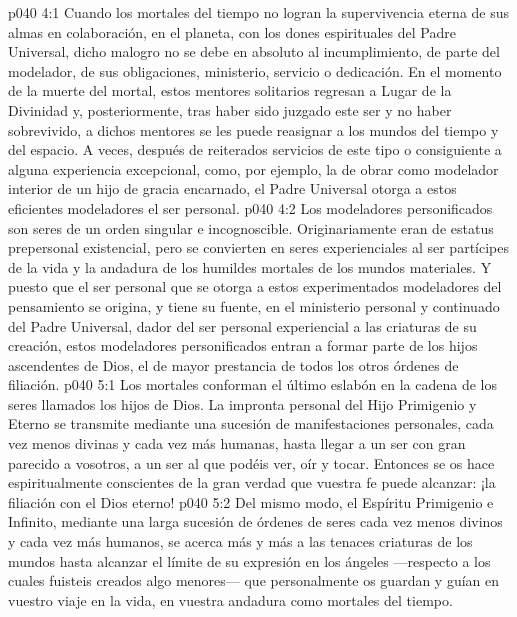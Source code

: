 \vs p040 4:1 Cuando los mortales del tiempo no logran la supervivencia eterna de sus almas en colaboración, en el planeta, con los dones espirituales del Padre Universal, dicho malogro no se debe en absoluto al incumplimiento, de parte del modelador, de sus obligaciones, ministerio, servicio o dedicación. En el momento de la muerte del mortal, estos mentores solitarios regresan a Lugar de la Divinidad y, posteriormente, tras haber sido juzgado este ser y no haber sobrevivido, a dichos mentores se les puede reasignar a los mundos del tiempo y del espacio. A veces, después de reiterados servicios de este tipo o consiguiente a alguna experiencia excepcional, como, por ejemplo, la de obrar como modelador interior de un hijo de gracia encarnado, el Padre Universal otorga a estos eficientes modeladores el ser personal.
\vs p040 4:2 Los modeladores personificados son seres de un orden singular e incognoscible. Originariamente eran de estatus prepersonal existencial, pero se convierten en seres experienciales al ser partícipes de la vida y la andadura de los humildes mortales de los mundos materiales. Y puesto que el ser personal que se otorga a estos experimentados modeladores del pensamiento se origina, y tiene su fuente, en el ministerio personal y continuado del Padre Universal, dador del ser personal experiencial a las criaturas de su creación, estos modeladores personificados entran a formar parte de los hijos ascendentes de Dios, el de mayor prestancia de todos los otros órdenes de filiación.
\vs p040 5:1 Los mortales conforman el último eslabón en la cadena de los seres llamados los hijos de Dios. La impronta personal del Hijo Primigenio y Eterno se transmite mediante una sucesión de manifestaciones personales, cada vez menos divinas y cada vez más humanas, hasta llegar a un ser con gran parecido a vosotros, a un ser al que podéis ver, oír y tocar. Entonces se os hace espiritualmente conscientes de la gran verdad que vuestra fe puede alcanzar: ¡la filiación con el Dios eterno!
\vs p040 5:2 Del mismo modo, el Espíritu Primigenio e Infinito, mediante una larga sucesión de órdenes de seres cada vez menos divinos y cada vez más humanos, se acerca más y más a las tenaces criaturas de los mundos hasta alcanzar el límite de su expresión en los ángeles ---respecto a los cuales fuisteis creados algo menores--- que personalmente os guardan y guían en vuestro viaje en la vida, en vuestra andadura como mortales del tiempo.
